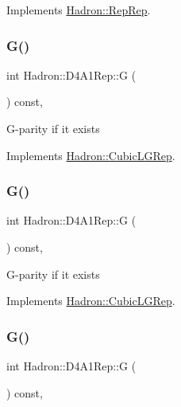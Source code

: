 Implements \mbox{\hyperlink{structHadron_1_1RepRep_a92c8802e5ed7afd7da43ccfd5b7cd92b}{Hadron\+::\+Rep\+Rep}}.

\mbox{\label{structHadron_1_1D4A1Rep_a4224f0d47cc0a894a9da4c8505d51c29}} 
\subsubsection{\texorpdfstring{G()}{G()}\hspace{0.1cm}{\footnotesize\ttfamily [1/3]}}
{\footnotesize\ttfamily int Hadron\+::\+D4\+A1\+Rep\+::G (\begin{DoxyParamCaption}{ }\end{DoxyParamCaption}) const\hspace{0.3cm}{\ttfamily [inline]}, {\ttfamily [virtual]}}

G-\/parity if it exists 

Implements \mbox{\hyperlink{structHadron_1_1CubicLGRep_ace26f7b2d55e3a668a14cb9026da5231}{Hadron\+::\+Cubic\+L\+G\+Rep}}.

\mbox{\label{structHadron_1_1D4A1Rep_a4224f0d47cc0a894a9da4c8505d51c29}} 
\subsubsection{\texorpdfstring{G()}{G()}\hspace{0.1cm}{\footnotesize\ttfamily [2/3]}}
{\footnotesize\ttfamily int Hadron\+::\+D4\+A1\+Rep\+::G (\begin{DoxyParamCaption}{ }\end{DoxyParamCaption}) const\hspace{0.3cm}{\ttfamily [inline]}, {\ttfamily [virtual]}}

G-\/parity if it exists 

Implements \mbox{\hyperlink{structHadron_1_1CubicLGRep_ace26f7b2d55e3a668a14cb9026da5231}{Hadron\+::\+Cubic\+L\+G\+Rep}}.

\mbox{\label{structHadron_1_1D4A1Rep_a4224f0d47cc0a894a9da4c8505d51c29}} 
\subsubsection{\texorpdfstring{G()}{G()}\hspace{0.1cm}{\footnotesize\ttfamily [3/3]}}
{\footnotesize\ttfamily int Hadron\+::\+D4\+A1\+Rep\+::G (\begin{DoxyParamCaption}{ }\end{DoxyParamCaption}) const\hspace{0.3cm}{\ttfamily [inline]}, {\ttfamily [virtual]}}

